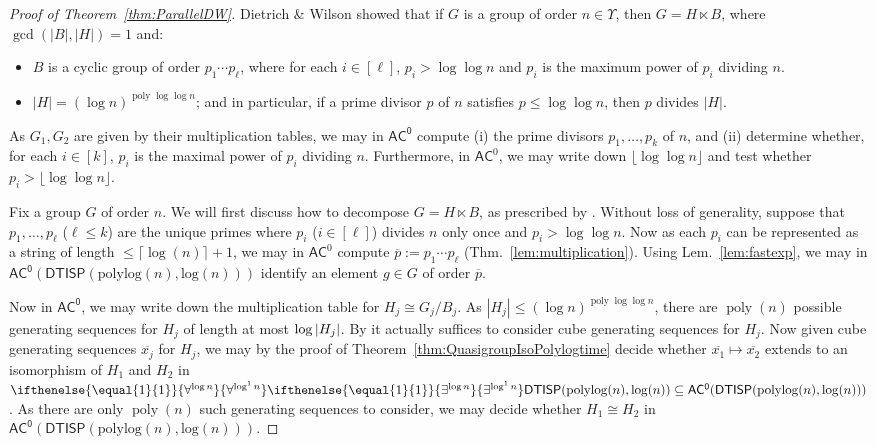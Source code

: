 \documentclass{article}
\newcommand{\betacc}[1]{\ifthenelse{\equal{#1}{1}}{\exists^{\log n}}{\exists^{\log^{#1}n}}} %
\newcommand{\alphacc}[1]{\ifthenelse{\equal{#1}{1}}{\forall^{\log n}}{\forall^{\log^{#1}n}}} %
\newcommand{\abs}[1]{\left|\mathinner{#1}\right|}
\newcommand{\Lem}[1]{Lem.~\ref{#1}\xspace}
\newcommand{\Thm}[1]{Thm.~\ref{#1}\xspace}
\DeclareMathOperator{\poly}{poly}
\newcommand*{\ComplexityClass}[1]{\ensuremath{\mathsf{#1}}\xspace}
\newcommand{\DTISP}{\ComplexityClass{DTISP}}
\newcommand{\DTISPpll}{\ensuremath{\DTISP(\mathrm{polylog}(n),\mathrm{log}(n))}\xspace}
\newcommand{\AC}{\ComplexityClass{AC}}
\newcommand{\ACz}{\ComplexityClass{AC^0}}
\begin{document}
\begin{proof}[Proof of Theorem~\ref{thm:ParallelDW}]
Dietrich \& Wilson showed \cite[Theorem~2.5]{DietrichWilson} that if $G$ is a group of order $n \in \Upsilon$, then $G = H \ltimes B$, where $\gcd(|B|,|H|)=1$ and:
\begin{itemize}
    \item $B$ is a cyclic group of order $p_{1} \cdots p_{\ell}$, where for each $i \in [\ell]$, $p_{i} > \log \log n$ and $p_{i}$ is the maximum power of $p_{i}$ dividing $n$.
    \item $|H| = (\log n)^{\poly \log \log n}$; and in particular, if a prime divisor $p$ of $n$ satisfies $p \leq \log \log n$, then $p$ divides $|H|$. 
\end{itemize} 

As $G_{1}, G_{2}$ are given by their multiplication tables, we may in $\ACz$ compute (i) the prime divisors $p_{1}, \ldots, p_{k}$ of $n$, and (ii) determine whether, for each $i \in[k]$, $p_{i}$ is the maximal power of $p_{i}$ dividing $n$. Furthermore, in $\AC^{0}$, we may write down $\lfloor \log \log n \rfloor$ and test whether $p_{i} > \lfloor \log \log n \rfloor$.

Fix a group $G$ of order $n$. We will first discuss how to decompose $G = H \ltimes B$, as prescribed by \cite[Theorem~2.5]{DietrichWilson}.
Without loss of generality, suppose that $p_{1}, \ldots, p_{\ell}$ ($\ell \leq k$) are the unique primes where $p_{i}$ ($i \in [\ell]$) divides $n$ only once and $p_{i} > \log \log n$. Now as each $p_{i}$ can be represented as a string of length $\leq \lceil \log(n)\rceil+1$, we may in $\AC^{0}$ compute $\overline{p} := p_{1} \cdots p_{\ell}$ (\Thm{lem:multiplication}). Using \Lem{lem:fastexp}, we may in $\ACz(\DTISPpll)$ identify an element $g \in G$ of order $\overline{p}$. 


Now in $\ACz$, we may write down the multiplication table for $H_{j} \cong G_{j}/B_{j}$.
As $|H_{j}| \leq (\log n)^{\poly \log \log n}$, there are $\poly(n)$ possible generating sequences for $H_{j}$ of length at most $\log\abs{H_j}$.
By \cite{BabaiSzemeredi} it actually suffices to consider cube generating sequences for $H_{j}$.
Now given cube generating sequences $\overline{x_{j}}$ for $H_{j}$, we may by the proof of Theorem~\ref{thm:QuasigroupIsoPolylogtime} decide whether $\overline{x_{1}} \mapsto \overline{x_{2}}$ extends to an isomorphism of $H_{1}$ and $H_{2}$ in $\alphacc{1}\betacc{1}\DTISPpll \subseteq \ACz(\DTISPpll)$.
As there are only $\poly(n)$ such generating sequences to consider, we may decide whether $H_{1} \cong H_{2}$ in $\ACz(\DTISPpll)$.


\end{proof}
\end{document}

